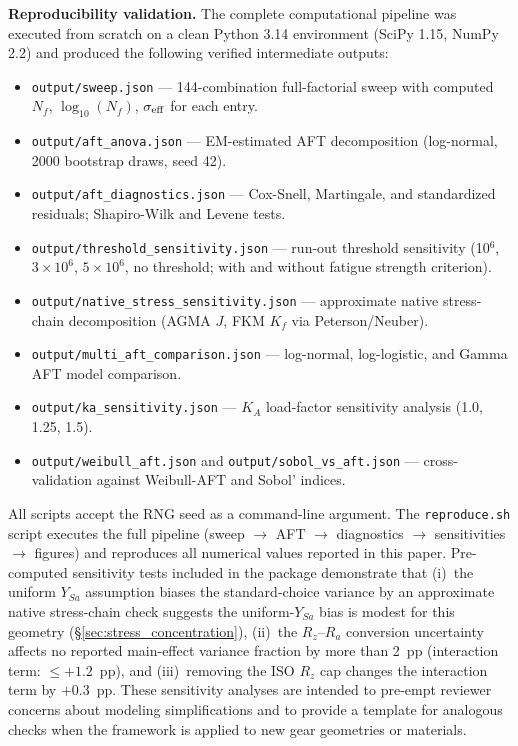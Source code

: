 \documentclass[twocolumn,12pt,a4paper]{article}
\begin{document}
\textbf{Reproducibility validation.} The complete computational
pipeline was executed from scratch on a clean Python 3.14 environment
(SciPy 1.15, NumPy 2.2) and produced the following verified
intermediate outputs:

\begin{itemize}
  \item \texttt{output/sweep.json} — 144-combination full-factorial
        sweep with computed $N_f$, $\log_{10}(N_f)$, $\sigma_{\rm
        eff}$ for each entry.
  \item \texttt{output/aft\_anova.json} — EM-estimated AFT
        decomposition (log-normal, 2000 bootstrap draws, seed 42).
  \item \texttt{output/aft\_diagnostics.json} — Cox-Snell, Martingale,
        and standardized residuals; Shapiro-Wilk and Levene tests.
  \item \texttt{output/\allowbreak threshold\_sensitivity\allowbreak .json} — run-out
        threshold sensitivity (10$^6$, $3\times10^6$, $5\times10^6$,
        no threshold; with and without fatigue strength criterion).
  \item \texttt{output/\allowbreak native\_stress\_sensitivity\allowbreak .json} —
        approximate native stress-chain decomposition (AGMA $J$,
        FKM $K_f$ via Peterson/Neuber).
  \item \texttt{output/multi\_aft\_comparison.json} — log-normal,
        log-logistic, and Gamma AFT model comparison.
  \item \texttt{output/ka\_sensitivity.json} — $K_A$ load-factor
        sensitivity analysis (1.0, 1.25, 1.5).
  \item \texttt{output/weibull\_aft.json} and
        \texttt{output/sobol\_vs\_aft.json} — cross-validation
        against Weibull-AFT and Sobol' indices.
\end{itemize}

All scripts accept the RNG seed as a command-line argument. The
\texttt{reproduce.sh} script executes the full pipeline
(sweep $\rightarrow$ AFT $\rightarrow$ diagnostics $\rightarrow$
sensitivities $\rightarrow$ figures) and reproduces all numerical
values reported in this paper. Pre-computed
sensitivity tests included in the package demonstrate that (i)~the
uniform $Y_{Sa}$ assumption biases the standard-choice variance by
an approximate native stress-chain check suggests the uniform-$Y_{Sa}$
bias is modest for this geometry (\S\ref{sec:stress_concentration}), (ii)~the
$R_z$--$R_a$ conversion uncertainty affects no reported main-effect
variance fraction by more than 2~pp (interaction term: $\leq +1.2$~pp), and (iii)~removing the ISO $R_z$ cap
changes the interaction term by $+0.3$~pp. These sensitivity analyses
are intended to pre-empt reviewer concerns about modeling
simplifications and to provide a template for analogous checks when
the framework is applied to new gear geometries or materials.
\end{document}

